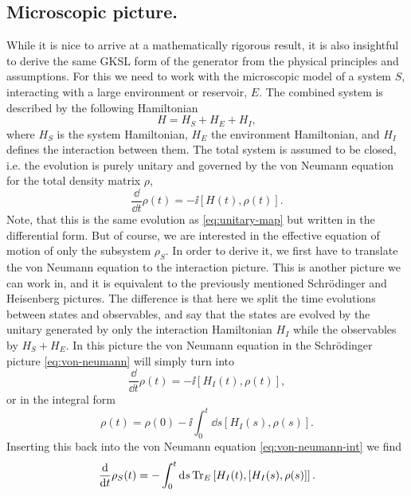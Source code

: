 \smallskip
\subsection{Microscopic picture.} While it is nice to arrive at a mathematically rigorous result, it is also insightful to derive the same GKSL form of the generator from the physical principles and assumptions. For this we need to work with the microscopic model of a system $S$, interacting with a large environment or reservoir, $E$. The combined system is described by the following Hamiltonian
\begin{equation}
    H = H_S + H_E + H_I,
\end{equation}
where $H_S$ is the system Hamiltonian, $H_E$ the environment Hamiltonian, and $H_I$ defines the interaction between them. The total system is assumed to be closed, i.e. the evolution is purely unitary and governed by the von Neumann equation for the total density matrix $\rho$,
\begin{equation}
    \label{eq:von-neumann}
    \frac{\dd}{\dd t}\rho(t) = -\ii [H(t), \rho(t)].
\end{equation}
Note, that this is the same evolution as \eqref{eq:unitary-map} but written in the differential form. But of course, we are interested in the effective equation of motion of only the subsystem $\rho_S$. In order to derive it, we first have to translate the von Neumann equation to the interaction picture. This is another picture we can work in, and it is equivalent to the previously mentioned Schrödinger and Heisenberg pictures. The difference is that here we split the time evolutions between states and observables, and say that the states are evolved by the unitary generated by only the interaction Hamiltonian $H_I$ while the observables by $H_S + H_E$. In this picture the von Neumann equation in the Schrödinger picture \eqref{eq:von-neumann} will simply turn into
\begin{equation}
    \label{eq:von-neumann-int}
    \frac{\dd}{\dd t}\rho(t) = -\ii [H_I(t), \rho(t)],
\end{equation}
or in the integral form
\begin{equation}
    \rho(t) = \rho(0) - \ii \int_0^t \dd s [H_I(s), \rho(s)].
\end{equation}
Inserting this back into the von Neumann equation \eqref{eq:von-neumann-int} we find
\begin{equation}
    \label{eq:starting-integral-von-neumann}
    \frac{\mathop{}\!\mathrm{d}}{\mathop{}\!\mathrm{d} t}\rho_S(t) = -\int_0^t \mathop{}\!\mathrm{d} s \operatorname{Tr}_E \left[H_I(t), \left[H_I(s), \rho(s)\right]\right].
\end{equation}
